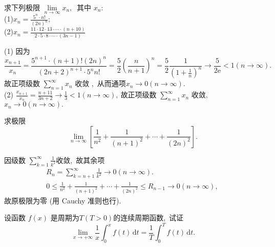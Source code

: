 \newpage
\begin{problem}
	求下列极限 $ \lim\limits_{n \rightarrow \infty} x_{n} ,\ $ 其中 $ x_{n}  :$\\
	(1)$  x_{n}=\frac{5^{n} \cdot n !}{(2 n)^{n}} ;  $\\
	(2)$ x_{n}=\frac{11 \cdot 12 \cdot 13 \cdot \cdots \cdot(n+10)}{2 \cdot 5 \cdot 8 \cdot \cdots \cdot(3 n-1)}$
\end{problem}
\begin{solution}
	(1) 因为
	$$\frac{x_{n+1}}{x_{n}}=\frac{5^{n+1} \cdot(n+1) !(2 n)^{n}}{(2 n+2)^{n+1} \cdot 5^{n} n !}=\frac{5}{2}\left(\frac{n}{n+1}\right)^{n}=\frac{5}{2} \frac{1}{\left(1+\frac{1}{n}\right)^{n}} \rightarrow \frac{5}{2 \mathrm{e}}<1(n \rightarrow \infty) .$$
	故正项级数 $ \sum\limits_{n=1}^{\infty} x_{n} $ 收敛 ,\ 从而通项$  x_{n} \rightarrow 0(n \rightarrow \infty) .$\\
	(2) $ \frac{x_{n+1}}{x_{n}}=\frac{n+11}{3 n+2} \rightarrow \frac{1}{3}<1(n \rightarrow \infty) ,\  $故正项级数  $\sum\limits_{n=1}^{\infty} x_{n} $ 收敛,\   $x_{n} \rightarrow 0(n \rightarrow \infty) . $
\end{solution}
\begin{problem}
	求极限 $$ \lim\limits_{n \rightarrow \infty}\left[\frac{1}{n^{2}}+\frac{1}{(n+1)^{2}}+\cdots+\frac{1}{(2 n)^{2}}\right] .$$
\end{problem}
\begin{solution}
	因级数  $\sum\limits_{k=1}^{\infty} \frac{1}{k^{2}}  $收敛,\ 故其余项
	$$\begin{array}{c}
		R_{n}=\sum\limits_{k=n+1}^{\infty} \frac{1}{k^{2}} \rightarrow 0(n \rightarrow \infty) . \\
		0 \leqslant \frac{1}{n^{2}}+\frac{1}{(n+1)^{2}}+\cdots+\frac{1}{(2 n)^{2}} \leqslant R_{n-1} \rightarrow 0(n \rightarrow \infty),\ 
	\end{array}$$
	故原极限为零 (用 Cauchy 准则也行).
\end{solution}
\newpage
\begin{problem}
	设函数  $f(x)$  是周期为$  T(T>0)  $的连续周期函数,\  试证
	$$\lim\limits_{x \rightarrow+\infty} \frac{1}{x} \int_{0}^{x} f(t) \,\mathrm{d} t=\frac{1}{T} \int_{0}^{T} f(t) \,\mathrm{d} t .$$
\end{problem}
